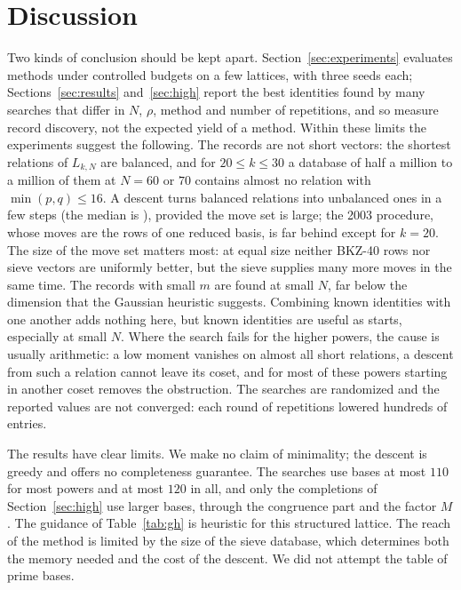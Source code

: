\documentclass[11pt]{amsart}
\theoremstyle{definition}
\theoremstyle{remark}
\begin{document}
\section{Discussion}\label{sec:discussion}

Two kinds of conclusion should be kept apart. Section~\ref{sec:experiments} evaluates methods
under controlled budgets on a few lattices, with three seeds each; Sections~\ref{sec:results}
and~\ref{sec:high} report the best identities found by many searches that differ in $N$, $\rho$,
method and number of repetitions, and so measure record discovery, not the expected yield of a
method. Within these limits the experiments suggest the following. The records are not short
vectors: the shortest relations of $L_{k,N}$ are balanced, and for $20\le k\le30$ a database of
half a million to a million of them at $N=60$ or $70$ contains almost no relation with
$\min(p,q)\le16$. A descent turns balanced relations into unbalanced ones in a few steps (the
median is \StepsMedian), provided the move set is large; the 2003 procedure, whose moves are the
rows of one reduced basis, is far behind except for $k=20$. The size of the move set matters
most: at equal size neither BKZ-40 rows nor sieve vectors are uniformly better, but the sieve
supplies many more moves in the same time. The records with small $m$ are found at small
$N$, far below the dimension that the Gaussian heuristic suggests. Combining known identities
with one another adds nothing here, but known identities are useful as starts, especially at
small $N$. Where the search
fails for the higher powers, the cause is usually arithmetic: a low moment vanishes on almost all
short relations, a descent from such a relation cannot leave its coset, and for most of these
powers starting in another coset removes the obstruction. The searches are randomized and the reported values are not
converged: each round of repetitions lowered hundreds of entries.

The results have clear limits. We make no claim of minimality; the descent is greedy and
offers no completeness guarantee. The searches use bases at most $110$ for most powers and
at most $120$ in all, and only the completions of Section~\ref{sec:high} use larger bases,
through the congruence part and the factor $M$. The guidance of Table~\ref{tab:gh} is heuristic for this structured lattice. The
reach of the method is limited by the size of the sieve database, which determines both the
memory needed and the cost of the descent. We did not attempt the table of prime bases.
\end{document}
